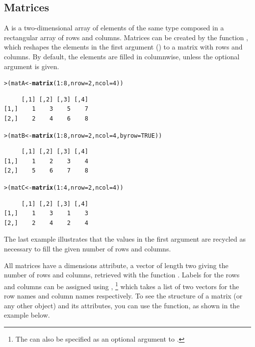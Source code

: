 \documentclass[10pt,krantz2]{krantz}\usepackage[]{graphicx}\usepackage[]{color}
\makeatletter
\newcommand{\hlnum}[1]{\textcolor[rgb]{0.686,0.059,0.569}{#1}}%
\newcommand{\hlopt}[1]{\textcolor[rgb]{0,0,0}{#1}}%
\newcommand{\hlstd}[1]{\textcolor[rgb]{0.345,0.345,0.345}{#1}}%
\newcommand{\hlkwb}[1]{\textcolor[rgb]{0.69,0.353,0.396}{#1}}%
\newcommand{\hlkwc}[1]{\textcolor[rgb]{0.333,0.667,0.333}{#1}}%
\newcommand{\hlkwd}[1]{\textcolor[rgb]{0.737,0.353,0.396}{\textbf{#1}}}%
\newenvironment{kframe}{%
 \def\at@end@of@kframe{}%
 \ifinner\ifhmode%
  \def\at@end@of@kframe{\end{minipage}}%
  \begin{minipage}{\columnwidth}%
 \fi\fi%
 \def\FrameCommand##1{\hskip\@totalleftmargin \hskip-\fboxsep
 \colorbox{shadecolor}{##1}\hskip-\fboxsep
     \hskip-\linewidth \hskip-\@totalleftmargin \hskip\columnwidth}%
 \MakeFramed {\advance\hsize-\width
   \@totalleftmargin\z@ \linewidth\hsize
   \@setminipage}}%
 {\par\unskip\endMakeFramed%
 \at@end@of@kframe}
\newenvironment{knitrout}{}{} %
\renewenvironment{knitrout}{\small\renewcommand{\baselinestretch}{.85}}{} %
\makeatother
\begin{document}
\subsection{Matrices}
A  is a two-dimensional array of elements of the same type composed
in a rectangular array of rows and columns. Matrices can be created by the function
, which reshapes the elements in
the first argument () to a matrix with  rows and
 columns. By default, the elements are filled in columnwise, unless
the optional argument  is given.

\begin{knitrout}
\color{fgcolor}\begin{kframe}
\begin{alltt}
\hlstd{> }\hlstd{(matA} \hlkwb{<-} \hlkwd{matrix}\hlstd{(}\hlnum{1}\hlopt{:}\hlnum{8}\hlstd{,} \hlkwc{nrow} \hlstd{=} \hlnum{2}\hlstd{,} \hlkwc{ncol} \hlstd{=} \hlnum{4}\hlstd{))}
\end{alltt}
\begin{verbatim}
     [,1] [,2] [,3] [,4]
[1,]    1    3    5    7
[2,]    2    4    6    8
\end{verbatim}
\begin{alltt}
\hlstd{> }\hlstd{(matB} \hlkwb{<-} \hlkwd{matrix}\hlstd{(}\hlnum{1}\hlopt{:}\hlnum{8}\hlstd{,} \hlkwc{nrow} \hlstd{=} \hlnum{2}\hlstd{,} \hlkwc{ncol} \hlstd{=} \hlnum{4}\hlstd{,} \hlkwc{byrow} \hlstd{=} \hlnum{TRUE}\hlstd{))}
\end{alltt}
\begin{verbatim}
     [,1] [,2] [,3] [,4]
[1,]    1    2    3    4
[2,]    5    6    7    8
\end{verbatim}
\begin{alltt}
\hlstd{> }\hlstd{(matC} \hlkwb{<-} \hlkwd{matrix}\hlstd{(}\hlnum{1}\hlopt{:}\hlnum{4}\hlstd{,} \hlkwc{nrow} \hlstd{=} \hlnum{2}\hlstd{,} \hlkwc{ncol} \hlstd{=} \hlnum{4}\hlstd{))}
\end{alltt}
\begin{verbatim}
     [,1] [,2] [,3] [,4]
[1,]    1    3    1    3
[2,]    2    4    2    4
\end{verbatim}
\end{kframe}
\end{knitrout}
\noindent The last example illustrates that the values in the first argument are recycled
as necessary to fill the given number of rows and columns.

All matrices have a dimensions attribute, a vector of length two giving the number
of rows and columns, retrieved with the function . Labels for the rows and
columns can be assigned using ,%
\footnote{
The  can also be specified as an optional argument to .
}
which takes a list of two vectors for the
row names and column names respectively. To see the structure of a matrix
(or any other \R object) and its attributes, you can
use the  function, as shown in the example below.
\end{document}
